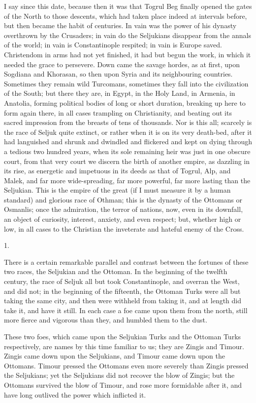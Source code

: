 I say since this date, because
then it was that Togrul Beg finally opened the gates of the North to
those descents, which had taken place indeed at intervals before,
but then became the habit of centuries. In vain was the power of
his dynasty overthrown by the Crusaders; in vain do the Seljukians
disappear from the annals of the world; in vain is Constantinople
respited; in vain is Europe saved. Christendom in arms had not yet
finished, it had but begun the work, in which it needed the grace to
persevere. Down came the savage hordes, as at first, upon Sogdiana and
Khorasan, so then upon Syria and its neighbouring countries. Sometimes
they remain wild Turcomans, sometimes they fall into the civilization
of the South; but there they are, in Egypt, in the Holy Land, in
Armenia, in Anatolia, forming political bodies of long or short
duration, breaking up here to form again there, in all cases trampling
on Christianity, and beating out its sacred impression from the
breasts of tens of thousands. Nor is this all; scarcely is the race of
Seljuk quite extinct, or rather when it is on its very death-bed,
after it had languished and shrunk and dwindled and flickered and kept
on dying through a tedious two hundred years, when its sole remaining
heir was just in one obscure court, from that very court we discern
the birth of another empire, as dazzling in its rise, as energetic and
impetuous in its deeds as that of Togrul, Alp, and Malek, and far more
wide-spreading, far more powerful, far more lasting than the Seljukian.
This is the empire of the great (if I must measure it by a human
standard) and glorious race of Othman; this is the dynasty of the
Ottomans or Osmanlis; once the admiration, the terror of nations, now,
even in its downfall, an object of curiosity, interest, anxiety, and
even respect; but, whether high or low, in all cases to the Christian
the inveterate and hateful enemy of the Cross.

1.

There is a certain remarkable
parallel and contrast between the fortunes of these two races, the
Seljukian and the Ottoman. In the beginning of the twelfth century,
the race of Seljuk all but took Constantinople, and overran the West,
and did not; in the beginning of the fifteenth, the Ottoman Turks were
all but taking the same city, and then were withheld from taking it,
and at length did take it, and have it still. In each case a foe came
upon them from the north, still more fierce and vigorous than they,
and humbled them to the dust.

These two foes, which came
upon the Seljukian Turks and the Ottoman Turks respectively, are names
by this time familiar to us; they are Zingis and Timour. Zingis came
down upon the Seljukians, and Timour came down upon the Ottomans.
Timour pressed the Ottomans even more severely than Zingis pressed the
Seljukians; yet the Seljukians did not recover the blow of Zingis; but
the Ottomans survived the blow of Timour, and rose more formidable
after it, and have long outlived the power which inflicted it.

